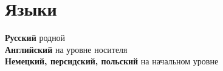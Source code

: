 \documentclass[11pt]{article} %
\begin{document}
\section*{Языки}

\textbf{Русский} родной\\
\textbf{Английский} на уровне носителя\\
\textbf{Немецкий, персидский, польский} на начальном уровне




\end{document}
